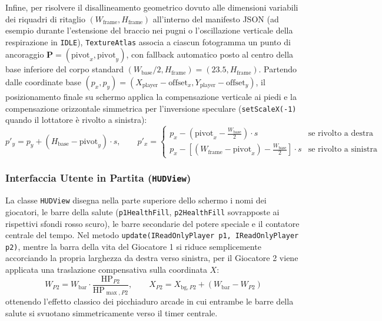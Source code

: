 \documentclass[11pt, a4paper]{article}
\begin{document}
Infine, per risolvere il disallineamento geometrico dovuto alle dimensioni variabili dei riquadri di ritaglio $(W_{\text{frame}}, H_{\text{frame}})$ all'interno del manifesto JSON (ad esempio durante l'estensione del braccio nei pugni o l'oscillazione verticale della respirazione in \texttt{IDLE}), \texttt{TextureAtlas} associa a ciascun fotogramma un punto di ancoraggio $\mathbf{P} = (\text{pivot}_x, \text{pivot}_y)$, con fallback automatico posto al centro della base inferiore del corpo standard $(W_{\text{base}}/2, H_{\text{frame}}) = (23.5, H_{\text{frame}})$. 
Partendo dalle coordinate base $(p_x, p_y) = (X_{\text{player}} - \text{offset}_x, Y_{\text{player}} - \text{offset}_y)$, il posizionamento finale su schermo applica la compensazione verticale ai piedi e la compensazione orizzontale simmetrica per l'inversione speculare (\texttt{setScaleX(-1)} quando il lottatore è rivolto a sinistra):
\begin{equation}
    p'_y = p_y + \left(H_{\text{base}} - \text{pivot}_y\right) \cdot s, \qquad
    p'_x = 
    \begin{cases}
        p_x - \left(\text{pivot}_x - \frac{W_{\text{base}}}{2}\right) \cdot s & \text{se rivolto a destra} \\[6pt]
        p_x - \left[\left(W_{\text{frame}} - \text{pivot}_x\right) - \frac{W_{\text{base}}}{2}\right] \cdot s & \text{se rivolto a sinistra}
    \end{cases}
\end{equation}

\subsubsection{Interfaccia Utente in Partita (\texttt{HUDView})}
La classe \texttt{HUDView} disegna nella parte superiore dello schermo i nomi dei giocatori, le barre della salute (\texttt{p1HealthFill}, \texttt{p2HealthFill} sovrapposte ai rispettivi sfondi rosso scuro), le barre secondarie del potere speciale e il contatore centrale del tempo. Nel metodo \texttt{update(IReadOnlyPlayer p1, IReadOnlyPlayer p2)}, mentre la barra della vita del Giocatore 1 si riduce semplicemente accorciando la propria larghezza da destra verso sinistra, per il Giocatore 2 viene applicata una traslazione compensativa sulla coordinata $X$:
\begin{equation}
    W_{P2} = W_{\text{bar}} \cdot \frac{\text{HP}_{P2}}{\text{HP}_{\max, P2}}, \qquad X_{P2} = X_{\text{bg}, P2} + \left(W_{\text{bar}} - W_{P2}\right)
\end{equation}
ottenendo l'effetto classico dei picchiaduro arcade in cui entrambe le barre della salute si svuotano simmetricamente verso il timer centrale.
\end{document}
